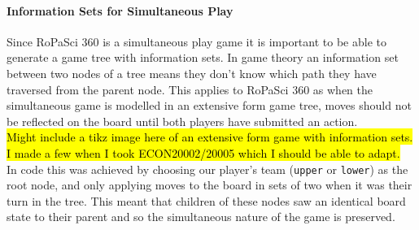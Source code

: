 \documentclass{article}
\begin{document}
\paragraph{Information Sets for Simultaneous Play}
Since RoPaSci 360 is a simultaneous play game it is important to be able to generate a game tree with information sets. In game theory an information set between two nodes of a tree means they don't know which path they have traversed from the parent node. This applies to RoPaSci 360 as when the simultaneous game is modelled in an extensive form game tree, moves should not be reflected on the board until both players have submitted an action.\\[2mm]
\hl{Might include a tikz image here of an extensive form game with information sets. I made a few when I took ECON20002/20005 which I should be able to adapt.}\\[2mm]
In code this was achieved by choosing our player's team (\verb|upper| or \verb|lower|) as the root node, and only applying moves to the board in sets of two when it was their turn in the tree. This meant that children of these nodes saw an identical board state to their parent and so the simultaneous nature of the game is preserved.
\end{document}

